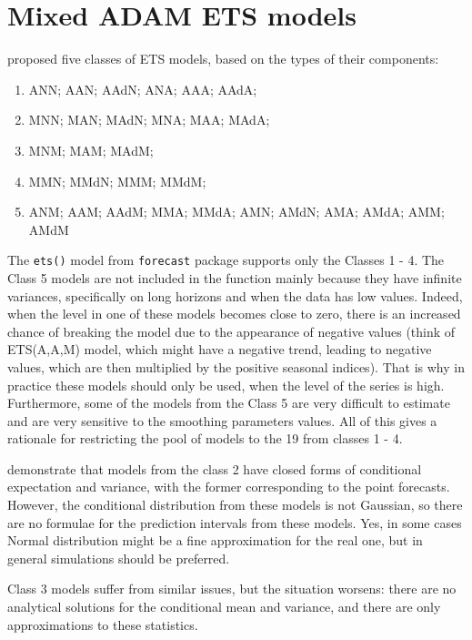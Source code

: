 \documentclass[
]{book}
\providecommand{\tightlist}{%
  \setlength{\itemsep}{0pt}\setlength{\parskip}{0pt}}
\theoremstyle{definition}
\theoremstyle{definition}
\theoremstyle{definition}
\theoremstyle{definition}
\theoremstyle{remark}
\begin{document}
\hypertarget{ADAMETSMixedModels}{%
\section{Mixed ADAM ETS models}\label{ADAMETSMixedModels}}

\citet{Hyndman2008b} proposed five classes of ETS models, based on the types of their components:

\begin{enumerate}
\def\labelenumi{\arabic{enumi}.}
\tightlist
\item
  ANN; AAN; AAdN; ANA; AAA; AAdA;
\item
  MNN; MAN; MAdN; MNA; MAA; MAdA;
\item
  MNM; MAM; MAdM;
\item
  MMN; MMdN; MMM; MMdM;
\item
  ANM; AAM; AAdM; MMA; MMdA; AMN; AMdN; AMA; AMdA; AMM; AMdM
\end{enumerate}

The \texttt{ets()} model from \texttt{forecast} package supports only the Classes 1 - 4. The Class 5 models are not included in the function mainly because they have infinite variances, specifically on long horizons and when the data has low values. Indeed, when the level in one of these models becomes close to zero, there is an increased chance of breaking the model due to the appearance of negative values (think of ETS(A,A,M) model, which might have a negative trend, leading to negative values, which are then multiplied by the positive seasonal indices). That is why in practice these models should only be used, when the level of the series is high. Furthermore, some of the models from the Class 5 are very difficult to estimate and are very sensitive to the smoothing parameters values. All of this gives a rationale for restricting the pool of models to the 19 from classes 1 - 4.

\citet{Hyndman2008b} demonstrate that models from the class 2 have closed forms of conditional expectation and variance, with the former corresponding to the point forecasts. However, the conditional distribution from these models is not Gaussian, so there are no formulae for the prediction intervals from these models. Yes, in some cases Normal distribution might be a fine approximation for the real one, but in general simulations should be preferred.

Class 3 models suffer from similar issues, but the situation worsens: there are no analytical solutions for the conditional mean and variance, and there are only approximations to these statistics.
\end{document}
